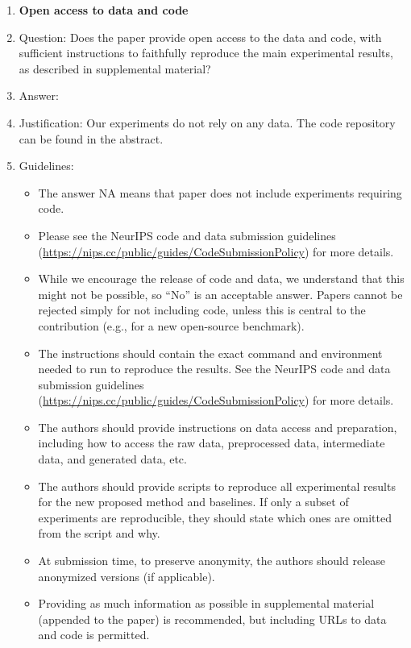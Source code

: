 \documentclass{article}
\theoremstyle{remark}
\begin{document}
\begin{enumerate}
\item {\bf Open access to data and code}
    \item[] Question: Does the paper provide open access to the data and code, with sufficient instructions to faithfully reproduce the main experimental results, as described in supplemental material?
    \item[] Answer: \answerYes{} %
    \item[] Justification: Our experiments do not rely on any data. The code repository can be found in the abstract.
    \item[] Guidelines:
    \begin{itemize}
        \item The answer NA means that paper does not include experiments requiring code.
        \item Please see the NeurIPS code and data submission guidelines (\url{https://nips.cc/public/guides/CodeSubmissionPolicy}) for more details.
        \item While we encourage the release of code and data, we understand that this might not be possible, so “No” is an acceptable answer. Papers cannot be rejected simply for not including code, unless this is central to the contribution (e.g., for a new open-source benchmark).
        \item The instructions should contain the exact command and environment needed to run to reproduce the results. See the NeurIPS code and data submission guidelines (\url{https://nips.cc/public/guides/CodeSubmissionPolicy}) for more details.
        \item The authors should provide instructions on data access and preparation, including how to access the raw data, preprocessed data, intermediate data, and generated data, etc.
        \item The authors should provide scripts to reproduce all experimental results for the new proposed method and baselines. If only a subset of experiments are reproducible, they should state which ones are omitted from the script and why.
        \item At submission time, to preserve anonymity, the authors should release anonymized versions (if applicable).
        \item Providing as much information as possible in supplemental material (appended to the paper) is recommended, but including URLs to data and code is permitted.
    \end{itemize}



\end{enumerate}
\end{document}
